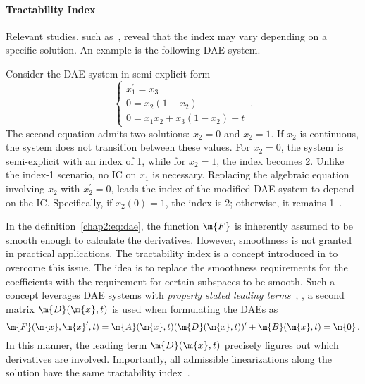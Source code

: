 \paragraph{Tractability Index}

Relevant studies, such as~\cite{lamour2013differential}, reveal that the index may vary depending on a specific solution. An example is the following \ac{DAE} system.

\begin{example}
  Consider the \ac{DAE} system in semi-explicit form
  \begin{equation*}
    \begin{cases}
    x_1^{\prime} = x_3 \\
    0 = x_2(1 - x_2) \\
    0 = x_1x_2 + x_3(1 - x_2) - t
    \end{cases} \, \text{.}
  \end{equation*}
  The second equation admits two solutions: $x_2 = 0$ and $x_2 = 1$. If $x_2$ is continuous, the system does not transition between these values. For $x_2 = 0$, the system is semi-explicit with an index of 1, while for $x_2 = 1$, the index becomes 2. Unlike the index-1 scenario, no \ac{IC} on $x_1$ is necessary. Replacing the algebraic equation involving $x_2$ with $x_2^{\prime} = 0$, leads the index of the modified \ac{DAE} system to depend on the \ac{IC}. Specifically, if $x_2(0) = 1$, the index is 2; otherwise, it remains 1~\cite[Section 3.3]{lamour2013differential}.
\end{example}

In the definition~\eqref{chap2:eq:dae}, the function $\m{F}$ is inherently assumed to be smooth enough to calculate the derivatives. However, smoothness is not granted in practical applications. The tractability index is a concept introduced in \citet{griepentrog1986differential, marz2002index} to overcome this issue. The idea is to replace the smoothness requirements for the coefficients with the requirement for certain subspaces to be smooth. Such a concept leverages \ac{DAE} systems with \emph{properly stated leading terms}~\cite{lamour2013differential}, \ie{}, a second matrix $\m{D}(\m{x}, t)$ is used when formulating the \acp{DAE} as
%
\begin{equation*}
  \m{F}(\m{x}, \m{x}^{\prime}, t) = \m{A}(\m{x}, t) (\m{D}(\m{x}, t))^{\prime} + \m{B}(\m{x}, t) = \m{0} \, \text{.}
\end{equation*}
%
In this manner, the leading term $\m{D}(\m{x}, t)$ precisely figures out which derivatives are involved. Importantly, all admissible linearizations along the solution have the same tractability index~\cite{marz2005characterizing}.


